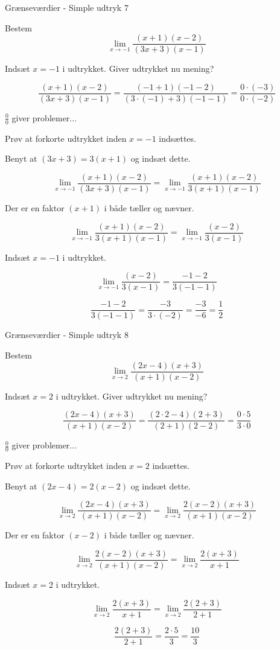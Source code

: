 \documentclass{article}
\begin{document}
\newpage
\begin{exercise}{Grænseværdier - Simple udtryk 7}
	
	Bestem 
	\[
	\lim_{x \to -1} \frac{(x+1)(x-2)}{(3x+3)(x-1)}
	\]
	
	
	\hint
	Indsæt $x=-1$ i udtrykket. Giver udtrykket nu mening?
	
	\hint
	\[
	\frac{(x+1)(x-2)}{(3x+3)(x-1)} = \frac{(-1+1)(-1-2)}{(3 \cdot (-1)+3)(-1-1)} = \frac{0 \cdot (-3)}{0 \cdot (-2)}
	\]
	
	\hint
	$\frac{0}{0}$ giver problemer...
	
	\hint
	Prøv at forkorte udtrykket inden $x=-1$ indsættes.
	
	\hint
	Benyt at $(3x+3) = 3 (x+1)$ og indsæt dette.
	
	\hint
	\[
	\lim_{x \to -1} \frac{(x+1)(x-2)}{(3x+3)(x-1)} = \lim_{x \to -1} \frac{(x+1)(x-2)}{3(x+1)(x-1)}
	\]
	
	\hint
	Der er en faktor $(x+1)$ i både tæller og nævner.
	
	\hint
	\[
	\lim_{x \to -1} \frac{(x+1)(x-2)}{3(x+1)(x-1)} = \lim_{x \to -1} \frac{(x-2)}{3(x-1)}
	\]
	
	\hint
	Indsæt $x=-1$ i udtrykket.
	
	\hint
	\[
	\lim_{x \to -1} \frac{(x-2)}{3(x-1)} = \frac{-1-2}{3(-1-1)}
	\]
	
	\hint
	\[
	\frac{-1-2}{3(-1-1)}  = \frac{-3}{3\cdot (-2)} = \frac{-3}{-6} = \frac{1}{2}	
	\]                    
	
	
\end{exercise}

\newpage
\begin{exercise}{Grænseværdier - Simple udtryk 8}
	
	Bestem 
	\[
	\lim_{x \to 2} \frac{(2x-4)(x+3)}{(x+1)(x-2)}
	\]
	
	
	\hint
	Indsæt $x=2$ i udtrykket. Giver udtrykket nu mening?
	
	\hint
	\[
	\frac{(2x-4)(x+3)}{(x+1)(x-2)} = \frac{(2 \cdot 2-4)(2+3)}{(2+1)(2-2)} = \frac{0 \cdot 5}{3 \cdot 0}
	\]
	
	\hint
	$\frac{0}{0}$ giver problemer...
	
	\hint
	Prøv at forkorte udtrykket inden $x=2$ indsættes.
	
	\hint
	Benyt at $(2x-4) = 2 (x-2)$ og indsæt dette.
	
	\hint
	\[
	\lim_{x \to 2} \frac{(2x-4)(x+3)}{(x+1)(x-2)} = \lim_{x \to 2} \frac{2(x-2)(x+3)}{(x+1)(x-2)}
	\]
	
	
	\hint
	Der er en faktor $(x-2)$ i både tæller og nævner.
	
	\hint
	\[
	\lim_{x \to 2} \frac{2(x-2)(x+3)}{(x+1)(x-2)} = \lim_{x \to 2} \frac{2(x+3)}{x+1}
	\]
	
	\hint
	Indsæt $x=2$ i udtrykket.
	
	\hint
	\[
	\lim_{x \to 2} \frac{2(x+3)}{x+1} = \lim_{x \to 2} \frac{2(2+3)}{2+1}
	\]
	
	\hint
	\[
	\frac{2(2+3)}{2+1} = \frac{2 \cdot 5}{3} = \frac{10}{3}
	\]
	
	
\end{exercise}

\newpage
\end{document}
